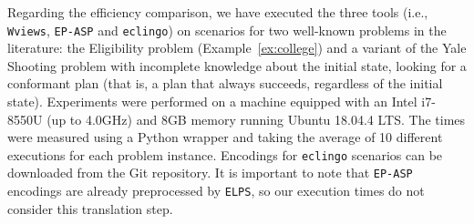 \documentclass{new_tlp}
\def\eclingo{{\tt eclingo}}
\def\wviews{{\tt Wviews}}
\def\wviews{{\tt Wviews}}
\def\EPASP{{\tt EP-ASP}}
\begin{document}

Regarding the efficiency comparison, we have executed the three tools (i.e., \wviews, \EPASP{} and \eclingo) on scenarios for two well-known problems in the literature: the Eligibility problem (Example~\ref{ex:college}) and a variant of the Yale Shooting problem with incomplete knowledge about the initial state, looking for a conformant plan (that is, a plan that always succeeds, regardless of the initial state).
%
Experiments were performed on a machine equipped with an Intel i7-8550U (up to 4.0GHz) and 8GB memory running Ubuntu 18.04.4 LTS.
%
The times were measured using a Python wrapper and taking the average of 10 different executions for each problem instance.
%
%
%
Encodings for \eclingo{} scenarios can be downloaded from the Git repository.
It is important to note that \EPASP{} encodings are already preprocessed by {\tt ELPS}, so our execution times do not consider this translation step.
\end{document}
